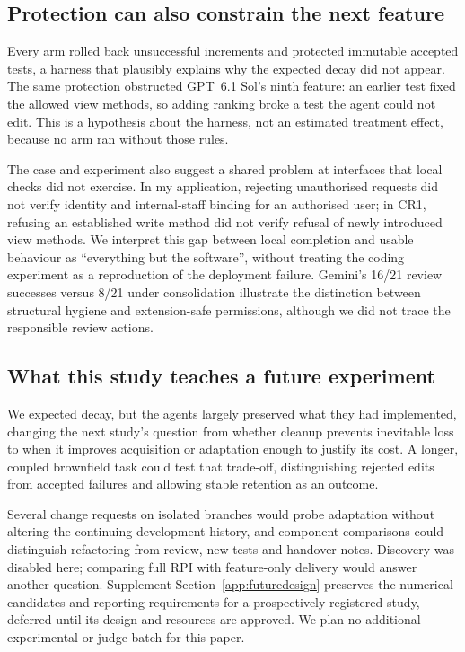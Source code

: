 \documentclass[11pt,a4paper]{article}
\begin{document}
\subsection{Protection can also constrain the next feature}

Every arm rolled back unsuccessful increments and protected immutable
accepted tests, a harness that plausibly explains why the expected decay
did not appear. The same protection obstructed GPT~6.1 Sol's ninth feature:
an earlier test fixed the allowed view methods, so adding ranking broke a
test the agent could not edit. This is a hypothesis about the harness,
not an estimated treatment effect, because no arm ran without those rules.

The case and experiment also suggest a shared problem at interfaces that
local checks did not exercise. In my application, rejecting unauthorised
requests did not verify identity and internal-staff binding for an
authorised user; in CR1, refusing an established write method did not
verify refusal of newly introduced view methods. We interpret this
gap between local completion and usable behaviour as ``everything but the
software'', without treating the coding experiment as a reproduction of
the deployment failure. Gemini's 16/21 review successes versus 8/21 under
consolidation illustrate the distinction between structural hygiene and
extension-safe permissions, although we did not trace the responsible review
actions.

\subsection{What this study teaches a future experiment}\label{sec:futureexperiment}

We expected decay, but the agents largely preserved what they had
implemented, changing the next study's question from whether cleanup prevents
inevitable loss to when it improves acquisition or adaptation enough to
justify its cost. A longer, coupled brownfield task could test that
trade-off, distinguishing rejected edits from accepted failures and
allowing stable retention as an outcome.

Several change requests on isolated branches would probe adaptation without
altering the continuing development history, and component comparisons could
distinguish refactoring from review, new tests and handover notes.
Discovery was disabled here; comparing full RPI with feature-only delivery
would answer another question. Supplement Section~\ref{app:futuredesign}
preserves the numerical candidates and reporting requirements for a
prospectively registered study, deferred until its design and resources
are approved. We plan no additional experimental or judge batch for this paper.
\end{document}
